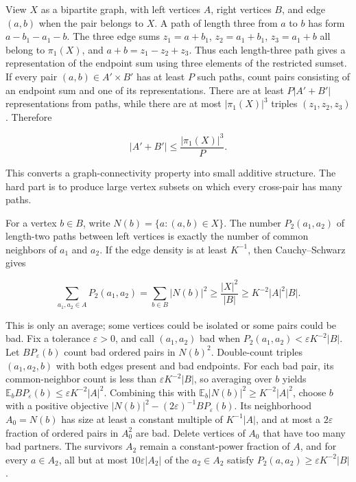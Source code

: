 View \(X\) as a bipartite graph, with left vertices \(A\), right vertices \(B\), and edge \((a,b)\) when the pair belongs to \(X\). A path of length three from \(a\) to \(b\) has form \(a-b_1-a_1-b\). The three edge sums \(z_1=a+b_1\), \(z_2=a_1+b_1\), \(z_3=a_1+b\) all belong to \(\pi_1(X)\), and \(a+b=z_1-z_2+z_3\). Thus each length-three path gives a representation of the endpoint sum using three elements of the restricted sumset. If every pair \((a,b)\in A'\times B'\) has at least \(P\) such paths, count pairs consisting of an endpoint sum and one of its representations. There are at least \(P|A'+B'|\) representations from paths, while there are at most \(|\pi_1(X)|^3\) triples \((z_1,z_2,z_3)\). Therefore

\[|A'+B'|\le \frac{|\pi_1(X)|^3}{P}.\]

This converts a graph-connectivity property into small additive structure. The hard part is to produce large vertex subsets on which every cross-pair has many paths.

For a vertex \(b\in B\), write \(N(b)=\{a:(a,b)\in X\}\). The number \(P_2(a_1,a_2)\) of length-two paths between left vertices is exactly the number of common neighbors of \(a_1\) and \(a_2\). If the edge density is at least \(K^{-1}\), then Cauchy--Schwarz gives

\[\sum_{a_1,a_2\in A}P_2(a_1,a_2)=\sum_{b\in B}|N(b)|^2\ge \frac{|X|^2}{|B|}\ge K^{-2}|A|^2|B|.\]

This is only an average; some vertices could be isolated or some pairs could be bad. Fix a tolerance \(\varepsilon>0\), and call \((a_1,a_2)\) bad when \(P_2(a_1,a_2)<\varepsilon K^{-2}|B|\). Let \(BP_\varepsilon(b)\) count bad ordered pairs in \(N(b)^2\). Double-count triples \((a_1,a_2,b)\) with both edges present and bad endpoints. For each bad pair, its common-neighbor count is less than \(\varepsilon K^{-2}|B|\), so averaging over \(b\) yields \(\mathbb E_b BP_\varepsilon(b)\le\varepsilon K^{-2}|A|^2\). Combining this with \(\mathbb E_b|N(b)|^2\ge K^{-2}|A|^2\), choose \(b\) with a positive objective \(|N(b)|^2-(2\varepsilon)^{-1}BP_\varepsilon(b)\). Its neighborhood \(A_0=N(b)\) has size at least a constant multiple of \(K^{-1}|A|\), and at most a \(2\varepsilon\) fraction of ordered pairs in \(A_0^2\) are bad. Delete vertices of \(A_0\) that have too many bad partners. The survivors \(A_2\) remain a constant-power fraction of \(A\), and for every \(a\in A_2\), all but at most \(10\varepsilon|A_2|\) of the \(a_2\in A_2\) satisfy \(P_2(a,a_2)\ge\varepsilon K^{-2}|B|\).

